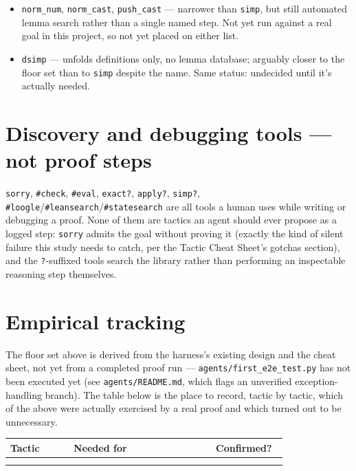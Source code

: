 \begin{itemize}
  \item \texttt{norm\_num}, \texttt{norm\_cast}, \texttt{push\_cast} --- narrower than \texttt{simp}, but still automated lemma search rather than a single named step. Not yet run against a real goal in this project, so not yet placed on either list.
  \item \texttt{dsimp} --- unfolds definitions only, no lemma database; arguably closer to the floor set than to \texttt{simp} despite the name. Same status: undecided until it's actually needed.
\end{itemize}


\section{Discovery and debugging tools --- not proof steps}

\texttt{sorry}, \texttt{\#check}, \texttt{\#eval}, \texttt{exact?}, \texttt{apply?}, \texttt{simp?}, \texttt{\#loogle}/\texttt{\#leansearch}/\texttt{\#statesearch} are all tools a human uses while writing or debugging a proof. None of them are tactics an agent should ever propose as a logged step: \texttt{sorry} admits the goal without proving it (exactly the kind of silent failure this study needs to catch, per the Tactic Cheat Sheet's gotchas section), and the \texttt{?}-suffixed tools search the library rather than performing an inspectable reasoning step themselves.

\section{Empirical tracking}

The floor set above is derived from the harness's existing design and the cheat sheet, not yet from a completed proof run --- \texttt{agents/first\_e2e\_test.py} has not been executed yet (see \texttt{agents/README.md}, which flags an unverified exception-handling branch). The table below is the place to record, tactic by tactic, which of the above were actually exercised by a real proof and which turned out to be unnecessary.

\begin{center}
\begin{tabular}{@{}p{0.20\linewidth}p{0.45\linewidth}p{0.15\linewidth}@{}}
\hline
\textbf{Tactic} & \textbf{Needed for} & \textbf{Confirmed?} \\
\hline
 & & \\
 & & \\
\hline
\end{tabular}
\end{center}

